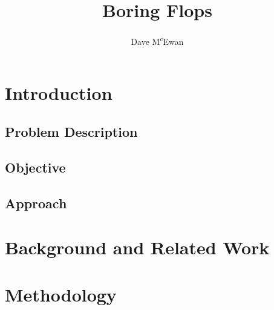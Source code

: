 \documentclass[a4paper]{article}
\newcommand{\doctitle}{Boring Flops}
\begin{document}

\title{
  \doctitle
}

\author{
  Dave M\textsuperscript{c}Ewan
}

\maketitle

\begin{abstract}
\end{abstract}


\section{Introduction} %
\label{sec:introduction}

\subsection{Problem Description} %
\label{sec:problem}


\subsection{Objective} %
\label{sec:objective}


\subsection{Approach} %
\label{sec:approach}



\section{Background and Related Work} %
\label{sec:background}


\section{Methodology} %
\label{sec:methodology}
\end{document}
